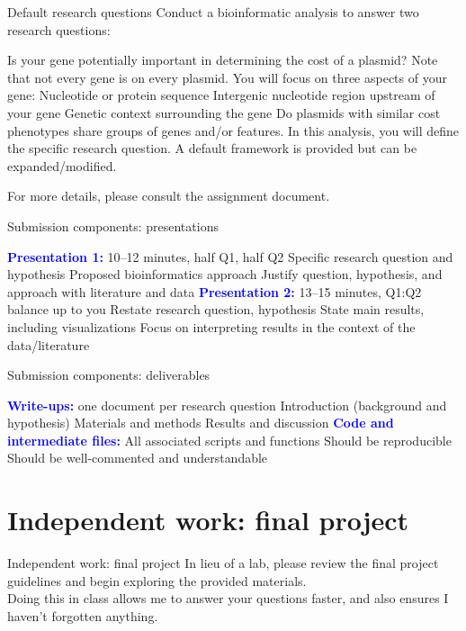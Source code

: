 \documentclass{beamer}
\newcommand{\blu}[1]{\textcolor{blue}{\textbf{#1}}}
\begin{document}
\begin{frame}{Default research questions}
    Conduct a bioinformatic analysis to answer two research questions: 
    \begin{outline}
        \1 Is your gene potentially important in determining the cost of a plasmid? Note that not every gene is on every plasmid. You will focus on three aspects of your gene:
            \2 Nucleotide or protein sequence 
            \2 Intergenic nucleotide region upstream of your gene
            \2 Genetic context surrounding the gene
        \1 Do plasmids with similar cost phenotypes share groups of genes and/or features.
            \2 In this analysis, you will define the specific research question.
            \2 A default framework is provided but can be expanded/modified.
        \end{outline}
    For more details, please consult the assignment document.
\end{frame}

\begin{frame}{Submission components: presentations}
    \begin{outline}
        \1[] \blu{Presentation 1:} 10--12 minutes, half Q1, half Q2
            \2 Specific research question and hypothesis
            \2 Proposed bioinformatics approach
            \2 Justify question, hypothesis, and approach with literature and data
        \1[] \blu{Presentation 2:} 13--15 minutes, Q1:Q2 balance up to you
            \2 Restate research question, hypothesis
            \2 State main results, including visualizations
            \2 Focus on interpreting results in the context of the data/literature
    \end{outline}  
\end{frame}

\begin{frame}{Submission components: deliverables}
    \begin{outline}
        \1[] \blu{Write-ups:} one document per research question
            \2 Introduction (background and hypothesis)
            \2 Materials and methods
            \2 Results and discussion
        \1[] \blu{Code and intermediate files:}
            \2 All associated scripts and functions
            \2 Should be reproducible
            \2 Should be well-commented and understandable
    \end{outline}
\end{frame}

\section{Independent work: final project}

\begin{frame}{Independent work: final project}
    In lieu of a lab, please review the final project guidelines and begin exploring the provided materials.\\
    \bigskip
    Doing this in class allows me to answer your questions faster, and also ensures I haven't forgotten anything.
\end{frame}
\end{document}
